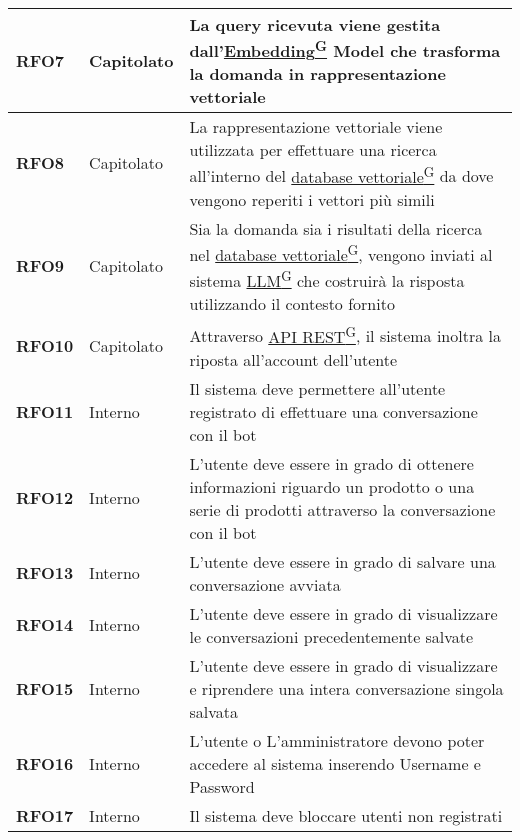 \begin{longtable}{|>{\centering\arraybackslash}m{}|>{\centering\arraybackslash}m{}|>{\arraybackslash}m{}|}
	\hline
	\textbf{RFO7} & Capitolato & La query ricevuta viene gestita dall’\href{https://code7crusaders.github.io/docs/RTB/documentazione_interna/glossario.html#embedding}{Embedding\textsuperscript{G}} Model che trasforma la domanda in rappresentazione vettoriale \\
	\hline
	\textbf{RFO8} & Capitolato & La rappresentazione vettoriale viene utilizzata per effettuare una ricerca all’interno del \href{https://code7crusaders.github.io/docs/RTB/documentazione_interna/glossario.html#database-vettoriale}{database vettoriale\textsuperscript{G}} da dove vengono reperiti i vettori più simili\\
	\hline
	\textbf{RFO9} & Capitolato & Sia la domanda sia i risultati della ricerca nel \href{https://code7crusaders.github.io/docs/RTB/documentazione_interna/glossario.html#database-vettoriale}{database vettoriale\textsuperscript{G}}, vengono inviati al sistema \href{https://code7crusaders.github.io/docs/RTB/documentazione_interna/glossario.html#llm-large-language-model}{LLM\textsuperscript{G}} che costruirà la risposta utilizzando il contesto fornito\\
	\hline
	\textbf{RFO10} & Capitolato & Attraverso \href{https://code7crusaders.github.io/docs/RTB/documentazione_interna/glossario.html#api-rest-representational-state-transfer}{API REST\textsuperscript{G}}, il sistema inoltra la riposta all'account dell’utente\\
	\hline
	\textbf{RFO11} & Interno & Il sistema deve permettere all'utente registrato di effettuare una conversazione con il bot\\
	\hline
	\textbf{RFO12} & Interno & L'utente deve essere in grado di ottenere informazioni riguardo un prodotto o una serie di prodotti attraverso la conversazione con il bot\\
	\hline
	\textbf{RFO13} & Interno & L'utente deve essere in grado di salvare una conversazione avviata\\
	\hline
	\textbf{RFO14} & Interno & L'utente deve essere in grado di visualizzare le conversazioni precedentemente salvate\\
	\hline
	\textbf{RFO15} & Interno & L'utente deve essere in grado di visualizzare e riprendere una intera conversazione singola salvata\\
	\hline
	\textbf{RFO16} & Interno & L'utente o L'amministratore devono poter accedere al sistema inserendo Username e Password\\
	\hline
	\textbf{RFO17} & Interno & Il sistema deve bloccare utenti non registrati\\

\end{longtable}
